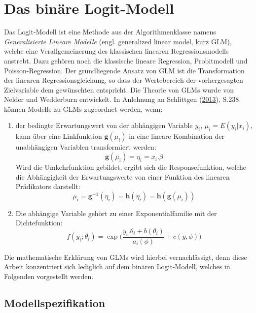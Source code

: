 \documentclass[12pt,]{article}
\providecommand{\tightlist}{%
  \setlength{\itemsep}{0pt}\setlength{\parskip}{0pt}}
\begin{document}
\section{Das binäre Logit-Modell}\label{das-binare-logit-modell}

Das Logit-Modell ist eine Methode aus der Algorithmenklasse namens
\emph{Generalisierte Lineare Modelle} (engl. generalized linear model,
kurz GLM), welche eine Verallgemeinerung des klassischen linearen
Regressionsmodells anstrebt. Dazu gehören noch die klassische lineare
Regression, Probitmodell und Poisson-Regression. Der grundliegende
Ansatz von GLM ist die Transformation der linearen Regressionsgleichung,
so dass der Wertebereich der vorhergesagten Zielvariable dem gewünschten
entspricht. Die Theorie von GLMs wurde von Nelder und Wedderburn
entwickelt. In Anlehnung an Schlittgen
(\protect\hyperlink{ref-schlittgen2013regressionsanalysen}{2013}), S.238
können Modelle zu GLMs zugeordnet werden, wenn:

\begin{enumerate}
\def\labelenumi{\arabic{enumi}.}
\tightlist
\item
  der bedingte Erwartungswert von der abhängigen Variable \(y_i\),
  \(\mu_i = E(y_i|x_i)\), kann über eine Linkfunktion
  \(\mathbf{g}(\mu_i)\) in eine lineare Kombination der unabhängigen
  Variablen transformiert werden:
  \[\mathbf{g}(\mu_i) = \eta_i = x_i.\beta\] Wird die Umkehrfunktion
  gebildet, ergibt sich die Responsefunktion, welche die Abhängigkeit
  der Erwartungswerte von einer Funktion des linearen Prädikators
  darstellt:
  \[\mu_i = \mathbf{g}^{-1}(\eta_i) = \mathbf{h}(\eta_i) =  \mathbf{h}(\mathbf{g}(\mu_i))\]
\item
  Die abhängige Variable gehört zu einer Exponentialfamilie mit der
  Dichtefunktion: \[
  f(y_i;\theta_i) = \exp \Bigg( \frac{y_i.\theta_i + b(\theta_i)}{a_i(\phi)} + c(y,\phi) \Bigg)
  \]
\end{enumerate}

Die mathematische Erklärung von GLMs wird hierbei vernachlässigt, denn
diese Arbeit konzentriert sich lediglich auf dem binären Logit-Modell,
welches in Folgenden vorgestellt werden.

\subsection{Modellspezifikation}\label{modellspezifikation}
\end{document}
